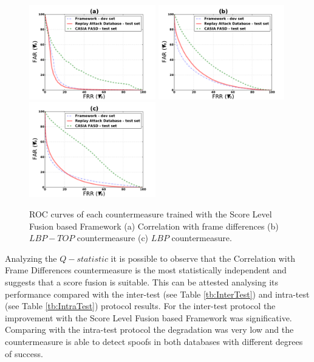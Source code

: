 \begin{figure}[ht]
\begin{center}

\includegraphics [width=5.5cm] {plots/FRAMEWORK/MOTION/SUM.pdf} 
\includegraphics [width=5.5cm] {plots/FRAMEWORK/LBPTOP/SUM.pdf}
\includegraphics [width=5.5cm] {plots/FRAMEWORK/LBP/SUM.pdf}

\caption{ROC curves of each countermeasure trained with the Score Level Fusion based Framework (a) Correlation with frame differences (b) $LBP-TOP$ countermeasure (c) $LBP$ countermeasure.} 
\label{fig:ROC_framework}
\end{center}
\end{figure}

Analyzing the $Q-statistic$ it is  possible to observe that the Correlation with Frame Differences countermeasure is the most statistically independent and suggests that a score fusion is suitable. This can be attested analysing its performance compared with the inter-test (see Table \ref{tb:InterTest}) and intra-test (see Table \ref{tb:IntraTest}) protocol results. For the inter-test protocol the improvement with the Score Level Fusion based Framework was significative. Comparing with the intra-test protocol the degradation was very low and the countermeasure is able to detect spoofs in both databases with different degrees of success.

